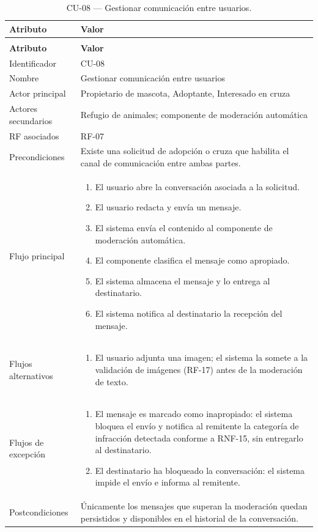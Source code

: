 \documentclass[journal,onecolumn]{IEEEtran}
\makeatletter
\newenvironment{atributos}[2]{%
	\small
	\begin{longtable}{@{}>{\raggedright\arraybackslash}p{4.2cm} >{\raggedright\arraybackslash}p{11.2cm}@{}}
		\caption{#2}\label{tab:#1}\\
		\toprule
		\textbf{Atributo} & \textbf{Valor} \\
		\midrule
		\endfirsthead
		\multicolumn{2}{@{}l}{\small\itshape (continuación)}\\
		\toprule
		\textbf{Atributo} & \textbf{Valor} \\
		\midrule
		\endhead
		\bottomrule
		\endlastfoot
	}{%
	\end{longtable}
	\normalsize
}
\makeatother
\begin{document}
	\begin{atributos}{CU-08}{CU-08 --- Gestionar comunicación entre usuarios.}
		Identificador & CU-08 \\
		Nombre & Gestionar comunicación entre usuarios \\
		Actor principal & Propietario de mascota, Adoptante, Interesado en cruza \\
		Actores secundarios & Refugio de animales; componente de moderación automática \\
		RF asociados & RF-07 \\
		Precondiciones & Existe una solicitud de adopción o cruza que habilita el canal de comunicación entre ambas partes. \\
		Flujo principal &
		\begin{enumerate}[leftmargin=*, nosep]
			\item El usuario abre la conversación asociada a la solicitud.
			\item El usuario redacta y envía un mensaje.
			\item El sistema envía el contenido al componente de moderación automática.
			\item El componente clasifica el mensaje como apropiado.
			\item El sistema almacena el mensaje y lo entrega al destinatario.
			\item El sistema notifica al destinatario la recepción del mensaje.
		\end{enumerate} \\
		Flujos alternativos &
		\begin{enumerate}[leftmargin=*, nosep]
			\item[2.1] El usuario adjunta una imagen; el sistema la somete a la validación de imágenes (RF-17) antes de la moderación de texto.
		\end{enumerate} \\
		Flujos de excepción &
		\begin{enumerate}[leftmargin=*, nosep]
			\item[4.1] El mensaje es marcado como inapropiado: el sistema bloquea el envío y notifica al remitente la categoría de infracción detectada conforme a RNF-15, sin entregarlo al destinatario.
			\item[5.1] El destinatario ha bloqueado la conversación: el sistema impide el envío e informa al remitente.
		\end{enumerate} \\
		Postcondiciones & Únicamente los mensajes que superan la moderación quedan persistidos y disponibles en el historial de la conversación. \\
	\end{atributos}
	
\end{document}
